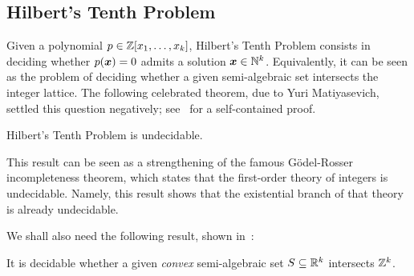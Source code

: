 \subsection{Hilbert's Tenth Problem}
Given a polynomial $p \in \mathbb{Z}[x_{1}, \ldots, x_{k}]$, Hilbert's Tenth Problem consists in deciding whether $p(\boldsymbol{x}) = 0$ admits a solution $\boldsymbol{x} \in \mathbb{N}^{k}$. Equivalently, it can be seen as the problem of deciding whether a given semi-algebraic set intersects the integer lattice. The following celebrated theorem, due to Yuri Matiyasevich, settled this question negatively; see~\cite{HTP} for a self-contained proof.
\begin{theorem}[Matiyasevich]
Hilbert's Tenth Problem is undecidable.
\end{theorem}
This result can be seen as a strengthening of the famous G\"{o}del-Rosser incompleteness theorem, which states that the first-order theory of integers is undecidable. Namely, this result shows that the existential branch of that theory is already undecidable.

We shall also need the following result, shown in~\cite{KP}:
\begin{theorem}
\label{thm:KP}
It is decidable whether a given \emph{convex} semi-algebraic set $S \subseteq \mathbb{R}^{k}$ intersects $\mathbb{Z}^{k}$.
\end{theorem}
